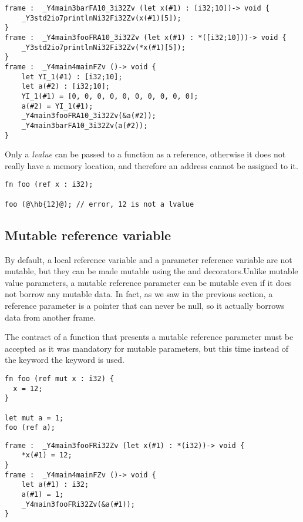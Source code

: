 \begin{lstlisting}[style=lyilVerb, caption=YIL result of Listing~\ref{lst:result_copy_v_ref_array}]
frame :  _Y4main3barFA10_3i32Zv (let x(#1) : [i32;10])-> void {
    _Y3std2io7printlnNi32Fi32Zv(x(#1)[5]);
}
frame :  _Y4main3fooFRA10_3i32Zv (let x(#1) : *([i32;10]))-> void {
    _Y3std2io7printlnNi32Fi32Zv(*x(#1)[5]);
}
frame :  _Y4main4mainFZv ()-> void {
    let YI_1(#1) : [i32;10];
    let a(#2) : [i32;10];
    YI_1(#1) = [0, 0, 0, 0, 0, 0, 0, 0, 0, 0];
    a(#2) = YI_1(#1);
    _Y4main3fooFRA10_3i32Zv(&a(#2));
    _Y4main3barFA10_3i32Zv(a(#2));
}
\end{lstlisting}

Only a \textit{lvalue} can be passed to a function as a reference, otherwise it
does not really have a memory location, and therefore an address cannot be
assigned to it.

\begin{lstlisting}[style=coloredverbatim, escapechar=@]
fn foo (ref x : i32);

foo (@\hb{12}@); // error, 12 is not a lvalue
\end{lstlisting}

\subsection {Mutable reference variable}
\label{sec:mut_ref_param}

By default, a local reference variable and a parameter reference variable are
not mutable, but they can be made mutable using the  and 
decorators.Unlike mutable value parameters, a mutable reference parameter can be
mutable even if it does not borrow any mutable data. In fact, as we saw in the
previous section, a reference parameter is a pointer that can never be null, so
it actually borrows data from another frame.

The contract of a function that presents a mutable reference parameter must be
accepted as it was mandatory for mutable parameters, but this time instead of
the keyword  the keyword  is used.

\begin{lstlisting}[style=coloredverbatim]
fn foo (ref mut x : i32) {
  x = 12;
}

let mut a = 1;
foo (ref a);
\end{lstlisting}

\begin {lstlisting}[style=lyilVerb]
frame :  _Y4main3fooFRi32Zv (let x(#1) : *(i32))-> void {
    *x(#1) = 12;
}
frame :  _Y4main4mainFZv ()-> void {
    let a(#1) : i32;
    a(#1) = 1;
    _Y4main3fooFRi32Zv(&a(#1));
}
\end{lstlisting}

